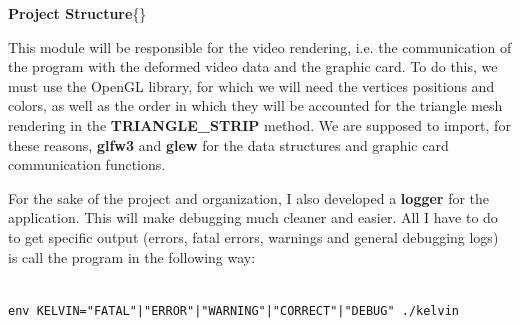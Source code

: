 \documentclass[12pt, a4paper]{report}
\newenvironment{loggentry}[2]%
{\noindent\textbf{#2}\newline\{\marginnote{#1}\}\newline\\}{\vspace{1.0cm}}
\begin{document}
\begin{loggentry}{(01 - 03)-06-2019}{Project Structure}
\begin{itemize}
				This module will be responsible for the video rendering, i.e. the communication of the program with the deformed  video data and the graphic card. To do this, we must use the OpenGL library, for which we will need the vertices positions and colors, as well as the order in which they will be accounted for the triangle mesh rendering in the \textbf{TRIANGLE\_STRIP} method. We are supposed to import, for these reasons, \textbf{glfw3} and \textbf{glew} for the data structures and graphic card communication functions.

		\end{itemize}

		For the sake of the project and organization, I also developed a \textbf{logger} for the application. This will make debugging much cleaner and easier. All I have to do to get specific output (errors, fatal errors, warnings and general debugging logs) is call the program in the following way:
		
	\begin{verbatim}

env KELVIN="FATAL"|"ERROR"|"WARNING"|"CORRECT"|"DEBUG" ./kelvin
	
	\end{verbatim}
	\end{loggentry}
\end{document}
